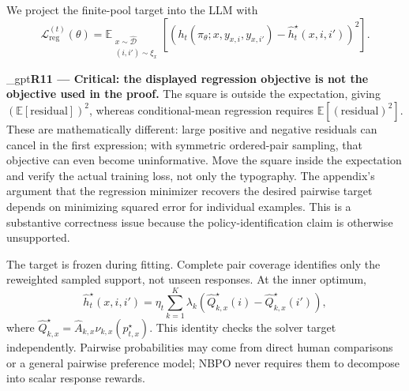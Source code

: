 \documentclass{article}
\newif\ifshowreviews
\newcommand{\reviewresponse}[1]{%
  \ifshowreviews
  \par\begingroup\color{blue!65!black}\hypersetup{allcolors=blue!65!black}\emergencystretch=2em%
  \noindent\textbf{Response:} #1\par\endgroup
  \fi}
\theoremstyle{remark}
\theoremstyle{plain}
\newcommand{\E}{\mathbb{E}}
\newcommand{\NBPO}{\textsc{NBPO}}
\begin{document}
We project the finite-pool target into the LLM with
\begin{equation}
\mathcal L_{\mathrm{reg}}^{(t)}(\theta)
=
\E_{\substack{x\sim\widehat{\mathcal D}\\(i,i')\sim\xi_x}}
\!\left[
\left(
 h_t(\pi_\theta;x,y_{x,i},y_{x,i'})
-\widehat h_t^\star(x,i,i')
\right)^2
\right].
\label{eq:regression-loss}
\end{equation}

\kekim_gpt{\textbf{R11 --- Critical: the displayed regression objective is not the objective used in the proof.} The square is outside the expectation, giving $(\E[\mathrm{residual}])^2$, whereas conditional-mean regression requires $\E[(\mathrm{residual})^2]$. These are mathematically different: large positive and negative residuals can cancel in the first expression; with symmetric ordered-pair sampling, that objective can even become uninformative. Move the square inside the expectation and verify the actual training loss, not only the typography. The appendix's argument that the regression minimizer recovers the desired pairwise target depends on minimizing squared error for individual examples. This is a substantive correctness issue because the policy-identification claim is otherwise unsupported.}
\reviewresponse{\textbf{R11 --- Partially addressed.} Equation~\eqref{eq:regression-loss} now places each example's squared residual inside the expectation, and the diagnostics use the same mean-squared-error definition. This fixes the manuscript's objective; checking the actual training loss still requires the implementation, which was not supplied with these attachments.}


The target is frozen during fitting. Complete pair coverage identifies only the reweighted sampled support, not unseen responses. At the inner optimum,
\begin{equation}
\widehat h_t^\star(x,i,i')
=
\eta_t\sum_{k=1}^K\lambda_k
\left(
\widehat Q_{k,x}^\star(i)-\widehat Q_{k,x}^\star(i')
\right),
\label{eq:finite-target-identity}
\end{equation}
where $\widehat Q_{k,x}^\star=\widehat A_{k,x}\nu_{k,x}(p_{t,x}^\star)$. This identity checks the solver target independently. Pairwise probabilities may come from direct human comparisons or a general pairwise preference model; \NBPO{} never requires them to decompose into scalar response rewards.
\end{document}
